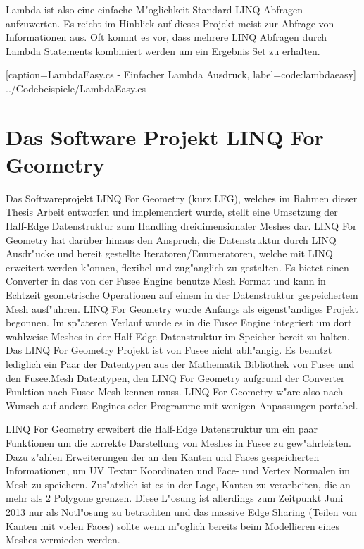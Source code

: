 \documentclass[pagesize, paper=a4, fontsize=12pt,titlepage=true, headings=small, headnosepline, abstractoff, liststotoc, nochapterprefix, plainheadsepline]{scrreprt}
\newcommand{\LFGS}{LINQ For Geometry }
\newcommand{\HES}{Half-Edge Datenstruktur }
\begin{document}
Lambda ist also eine einfache M"oglichkeit Standard LINQ Abfragen aufzuwerten. Es reicht im Hinblick auf dieses Projekt meist zur Abfrage von Informationen aus. Oft kommt es vor, dass mehrere LINQ Abfragen durch Lambda Statements kombiniert werden um ein Ergebnis Set zu erhalten. 

			[caption={LambdaEasy.cs - Einfacher Lambda Ausdruck}, label=code:lambdaeasy]
			{../Codebeispiele/LambdaEasy.cs}


\section {Das Software Projekt LINQ For Geometry}
Das Softwareprojekt \LFGS (kurz LFG), welches im Rahmen dieser Thesis Arbeit entworfen und implementiert wurde, stellt eine Umsetzung der \HES zum Handling dreidimensionaler Meshes dar. \LFGS hat darüber hinaus den Anspruch, die Datenstruktur durch LINQ Ausdr"ucke und bereit gestellte Iteratoren/Enumeratoren, welche mit LINQ erweitert werden k"onnen, flexibel und zug"anglich zu gestalten. Es bietet einen Converter in das von der Fusee Engine benutze Mesh Format und kann in Echtzeit geometrische Operationen auf einem in der Datenstruktur gespeichertem Mesh ausf"uhren. \LFGS wurde Anfangs als eigenst"andiges Projekt begonnen. Im sp"ateren Verlauf wurde es in die Fusee Engine integriert um dort wahlweise Meshes in der \HES im Speicher bereit zu halten. Das \LFGS Projekt ist von Fusee nicht abh"angig. Es benutzt lediglich ein Paar der Datentypen aus der Mathematik Bibliothek von Fusee und den Fusee.Mesh Datentypen, den \LFGS aufgrund der Converter Funktion nach Fusee Mesh kennen muss. \LFGS w"are also nach Wunsch auf andere Engines oder Programme mit wenigen Anpassungen portabel.

\LFGS erweitert die \HES um ein paar Funktionen um die korrekte Darstellung von Meshes in Fusee zu gew"ahrleisten. Dazu z"ahlen Erweiterungen der an den Kanten und Faces gespeicherten Informationen, um UV Textur Koordinaten und Face- und Vertex Normalen im Mesh zu speichern.
Zus"atzlich ist es in der Lage, Kanten zu verarbeiten, die an mehr als 2 Polygone grenzen. Diese L"osung ist allerdings zum Zeitpunkt Juni 2013 nur als Notl"osung zu betrachten und das massive Edge Sharing (Teilen von Kanten mit vielen Faces) sollte wenn m"oglich bereits beim Modellieren eines Meshes vermieden werden.
\newline
\end{document}
